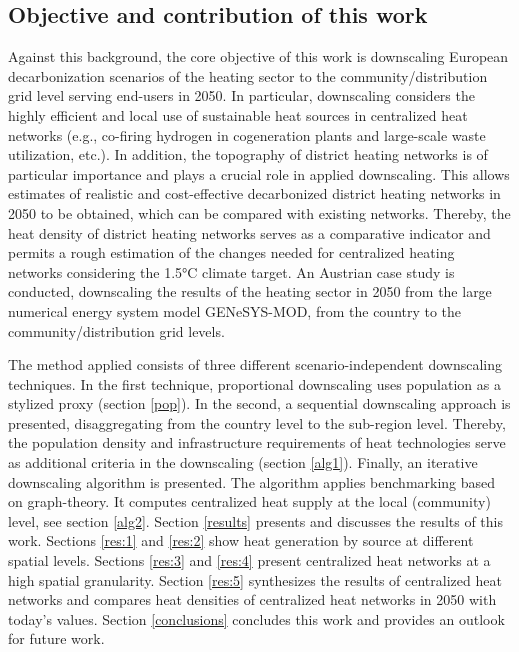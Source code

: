 \subsection{Objective and contribution of this work}
Against this background, the core objective of this work is downscaling European decarbonization scenarios of the heating sector to the community/distribution grid level serving end-users in 2050. In particular, downscaling considers the highly efficient and local use of sustainable heat sources in centralized heat networks (e.g., co-firing hydrogen in cogeneration plants and large-scale waste utilization, etc.). In addition, the topography of district heating networks is of particular importance and plays a crucial role in applied downscaling. This allows estimates of realistic and cost-effective decarbonized district heating networks in 2050 to be obtained, which can be compared with existing networks. Thereby, the heat density of district heating networks serves as a comparative indicator and permits a rough estimation of the changes needed for centralized heating networks considering the 1.5°C climate target. An Austrian case study is conducted, downscaling the results of the heating sector in 2050 from the large numerical energy system model GENeSYS-MOD, from the country to the community/distribution grid levels.\vspace{0.3cm}

The method applied consists of three different scenario-independent downscaling techniques. In the first technique, proportional downscaling uses population as a stylized proxy (section \ref{pop}). In the second, a sequential downscaling approach is presented, disaggregating from the country level to the sub-region level. Thereby, the population density and infrastructure requirements of heat technologies serve as additional criteria in the downscaling (section \ref{alg1}). Finally, an iterative downscaling algorithm is presented. The algorithm applies benchmarking based on graph-theory. It computes centralized heat supply at the local (community) level, see section \ref{alg2}. Section \ref{results} presents and discusses the results of this work. Sections \ref{res:1} and \ref{res:2} show heat generation by source at different spatial levels. Sections \ref{res:3} and \ref{res:4} present centralized heat networks at a high spatial granularity. Section \ref{res:5} synthesizes the results of centralized heat networks and compares heat densities of centralized heat networks in 2050 with today's values. Section \ref{conclusions} concludes this work and provides an outlook for future work.



